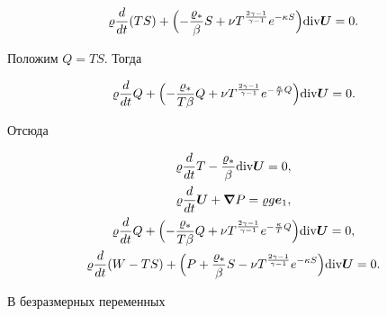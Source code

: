 \begin{equation}

\varrho\frac{d}{dt}(TS)+

\Bigl(-\frac{\varrho_*}{\beta} S+\nu T^{\frac{2\gamma-1}{\gamma-1}} e^{-\kappa S}\Bigr) 

{\mathop{\rm div}\nolimits} \boldsymbol U=0.

\label{lukashev:TS}

\end{equation}

Положим $Q=TS$. Тогда

\begin{equation}

\varrho\frac{d}{dt} Q+

\Bigl(-\frac{\varrho_*}{T \beta} Q+\nu T^{\frac{2\gamma-1}{\gamma-1}} e^{-\frac{\kappa}{T} Q}\Bigr) {\mathop{\rm div}\nolimits} \boldsymbol U=0.

\label{lukashev:Q}

\end{equation}

Отсюда

\begin{gather}

\varrho\frac{d}{dt} T-\frac{\varrho_*}{\beta}{\mathop{\rm div}\nolimits} \boldsymbol U=0,\label{lukashev:Eu}

\\

\varrho\frac{d}{dt} \boldsymbol U+ \boldsymbol \nabla P=\varrho g \boldsymbol e_1, 

\\

\varrho\frac{d}{dt} Q+ \Bigl( -\frac{\varrho_*}{T \beta} Q+\nu T^{\frac{2\gamma-1}{\gamma-1}} e^{-\frac{\kappa}{T} Q} \Bigr) {\mathop{\rm div}\nolimits} \boldsymbol U=0, 

\\

\varrho\frac{d}{dt} (W-TS)+\Bigl( P+\frac{\varrho_*}{\beta}S-\nu T^{\frac{2\gamma-1}{\gamma-1}} e^{-\kappa S}\Bigr) {\mathop{\rm div}\nolimits} \boldsymbol U=0.

\end{gather}

В безразмерных переменных

